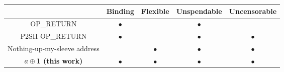 \begin{center}
    \newcommand{\y}{$\bullet$}
    \newcommand{\n}{}
    \begin{tabular}{ |c|c|c|c|c| }
     \hline
                                        & Binding & Flexible & Unspendable & Uncensorable \\
     \hline
     OP\_RETURN                         & \y      & \n       & \y          & \n \\
     P2SH OP\_RETURN                    & \y      & \n       & \y          & \y \\
     Nothing-up-my-sleeve address       & \n      & \y       & \y          & \y \\
     $a \oplus 1$ \textbf{(this work)}    & \y      & \y       & \y          & \y \\
     \hline
    \end{tabular}
\end{center}
